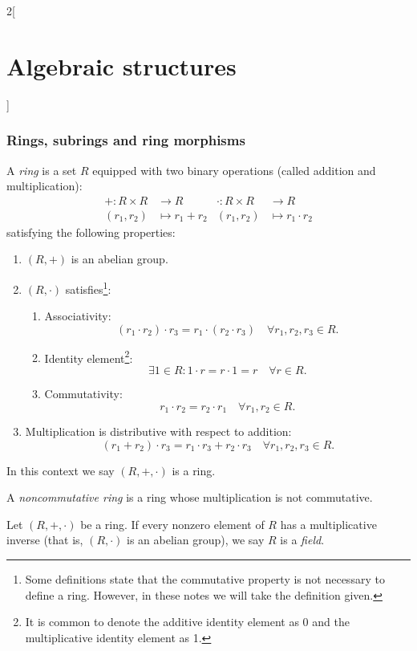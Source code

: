 \documentclass[../../../main.tex]{subfiles}
\begin{document}
\begin{multicols}{2}[\section{Algebraic structures}]
\subsubsection*{Rings, subrings and ring morphisms}
\begin{definition}[Ring]
    A \textit{ring} is a set $R$ equipped with two binary operations (called addition and multiplication):
    \begin{align*}
        +:R\times R&\longrightarrow R&\cdot:R\times R&\longrightarrow R\\
        (r_1,r_2)&\longmapsto r_1+ r_2&(r_1,r_2)&\longmapsto r_1\cdot r_2
    \end{align*}
    satisfying the following properties:
    \begin{enumerate}
        \item $(R,+)$ is an abelian group.
        \item $(R,\cdot)$ satisfies\footnote{Some definitions state that the commutative property is not necessary to define a ring. However, in these notes we will take the definition given.}:
        \begin{enumerate}
            \item Associativity: $$(r_1\cdot r_2)\cdot r_3=r_1\cdot(r_2\cdot r_3)\quad\forall r_1,r_2,r_3\in R.$$
            \item Identity element\footnote{It is common to denote the additive identity element as 0 and the multiplicative identity element as 1.}: $$\exists 1\in R:1\cdot r=r\cdot 1=r\quad\forall r\in R.$$
            \item Commutativity: $$r_1\cdot r_2=r_2\cdot r_1\quad\forall r_1,r_2\in R.$$
        \end{enumerate}
        \item Multiplication is distributive with respect to addition: $$(r_1+r_2)\cdot r_3=r_1\cdot r_3+r_2\cdot r_3\quad\forall r_1,r_2,r_3\in R.$$
    \end{enumerate}
    In this context we say $(R,+,\cdot)$ is a ring.
\end{definition}
\begin{definition}
    A \textit{noncommutative ring} is a ring whose multiplication is not commutative.
\end{definition}
\begin{definition}[Field]
    Let $(R,+,\cdot)$ be a ring. If every nonzero element of $R$ has a multiplicative inverse (that is, $(R,\cdot)$ is an abelian group), we say $R$ is a \textit{field}.
\end{definition}

\end{multicols}
\end{document}
